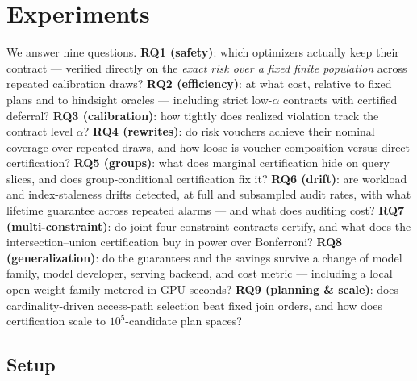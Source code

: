 \section{Experiments}
\label{sec:experiments}

We answer nine questions. \textbf{RQ1 (safety)}: which optimizers actually
keep their contract --- verified directly on the \emph{exact risk over a
fixed finite population} across repeated calibration draws?
\textbf{RQ2 (efficiency)}: at what cost, relative to fixed plans and to
hindsight oracles --- including strict low-$\alpha$ contracts with
certified deferral? \textbf{RQ3 (calibration)}: how tightly does realized
violation track the contract level $\alpha$? \textbf{RQ4 (rewrites)}: do
risk vouchers achieve their nominal coverage over repeated draws, and how
loose is voucher composition versus direct certification?
\textbf{RQ5 (groups)}: what does marginal
certification hide on query slices, and does group-conditional
certification fix it? \textbf{RQ6 (drift)}: are workload and index-staleness
drifts detected, at full and subsampled audit rates, with what lifetime
guarantee across repeated alarms --- and what does auditing cost?
\textbf{RQ7 (multi-constraint)}: do joint four-constraint contracts
certify, and what does the intersection--union certification buy in
power over Bonferroni?
\textbf{RQ8 (generalization)}: do the guarantees and the savings survive a
change of model family, model developer, serving backend, and cost metric
--- including a local open-weight family metered in GPU-seconds?
\textbf{RQ9 (planning \& scale)}: does cardinality-driven access-path
selection beat fixed join orders, and how does certification scale to
$10^5$-candidate plan spaces?

\subsection{Setup}
\label{sec:exp-setup}

